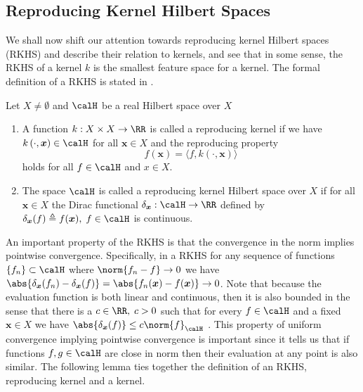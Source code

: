\subsection{Reproducing Kernel Hilbert Spaces}\label{Section1.2}

We shall now shift our attention towards reproducing kernel Hilbert spaces (RKHS) and describe their relation to kernels, and see that in some sense, the RKHS of a kernel $k$ is the smallest feature space for a kernel. The formal definition of a RKHS is stated in .

\begin{defe}[RKHS] \label{defe: RKHS}
    Let $X \neq \emptyset$ and $\calH$ be a real Hilbert space over $X$
    \begin{enumerate}
        \item A function $k : X \times X \to \RR$ is called a reproducing kernel if we have $k \left( \cdot, \bm{x} \right) \in \calH$ for all $\bm{x} \in X$ and the reproducing property
              \[
                  f(\bm{x}) = \langle f , k \left( \cdot, \bm{x} \right) \rangle
              \]
              holds for all $f \in \calH$ and $x \in X$.
        \item The space $\calH$ is called a reproducing kernel Hilbert space over $X$ if for all $\bm{x} \in X$ the Dirac functional $\delta_{\bm{x}} : \calH \to \RR$ defined by $\delta_{\bm{x}} (f) \triangleq f(\bm{x}), \; f \in \calH$ is continuous.
    \end{enumerate}
    \cite{SteinwartIngo2008SVMb}
\end{defe}

An important property of the RKHS is that the convergence in the norm implies pointwise convergence. Specifically, in a RKHS for any sequence of functions $\left\{ f_n \right\} \subset \calH$ where $\norm{f_n - f} \to 0$ we have $\abs{\delta_{\bm{x}} (f_n) - \delta_{\bm{x}} (f)} = \abs{f_n (\bm{x}) - f (\bm{x})} \to 0$. Note that because the evaluation function is both linear and continuous, then it is also bounded in the sense that there is a $c \in \RR, \; c > 0$ such that for every $f \in \calH$ and a fixed $\bm{x} \in X$ we have $\abs{\delta_{\bm{x}} (f)} \leq c \norm{f}_{\calH}$ \cite{BerezanskyMakarovich1996FaV1}. This property of uniform convergence implying pointwise convergence is important since it tells us that if functions $f,g \in \calH$ are close in norm then their evaluation at any point is also similar. The following lemma ties together the definition of an RKHS, reproducing kernel and a kernel.

